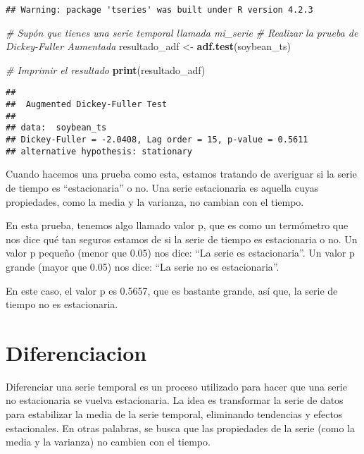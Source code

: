 \documentclass[
]{book}
\newenvironment{Shaded}{\begin{snugshade}}{\end{snugshade}}
\newcommand{\CommentTok}[1]{\textcolor[rgb]{0.56,0.35,0.01}{\textit{#1}}}
\newcommand{\FunctionTok}[1]{\textcolor[rgb]{0.13,0.29,0.53}{\textbf{#1}}}
\newcommand{\NormalTok}[1]{#1}
\newcommand{\OtherTok}[1]{\textcolor[rgb]{0.56,0.35,0.01}{#1}}
\begin{document}
\begin{verbatim}
## Warning: package 'tseries' was built under R version 4.2.3
\end{verbatim}

\begin{Shaded}
\begin{Highlighting}[]
\CommentTok{\# Supón que tienes una serie temporal llamada \textquotesingle{}mi\_serie\textquotesingle{}}
\CommentTok{\# Realizar la prueba de Dickey{-}Fuller Aumentada}
\NormalTok{resultado\_adf }\OtherTok{\textless{}{-}} \FunctionTok{adf.test}\NormalTok{(soybean\_ts)}

\CommentTok{\# Imprimir el resultado}
\FunctionTok{print}\NormalTok{(resultado\_adf)}
\end{Highlighting}
\end{Shaded}

\begin{verbatim}
## 
##  Augmented Dickey-Fuller Test
## 
## data:  soybean_ts
## Dickey-Fuller = -2.0408, Lag order = 15, p-value = 0.5611
## alternative hypothesis: stationary
\end{verbatim}

Cuando hacemos una prueba como esta, estamos tratando de averiguar si la serie de tiempo es ``estacionaria'' o no. Una serie estacionaria es aquella cuyas propiedades, como la media y la varianza, no cambian con el tiempo.

En esta prueba, tenemos algo llamado valor p, que es como un termómetro que nos dice qué tan seguros estamos de si la serie de tiempo es estacionaria o no. Un valor p pequeño (menor que 0.05) nos dice: ``La serie es estacionaria''. Un valor p grande (mayor que 0.05) nos dice: ``La serie no es estacionaria''.

En este caso, el valor p es 0.5657, que es bastante grande, así que, la serie de tiempo no es estacionaria.

\hypertarget{diferenciacion}{%
\chapter{Diferenciacion}\label{diferenciacion}}

Diferenciar una serie temporal es un proceso utilizado para hacer que una serie no estacionaria se vuelva estacionaria. La idea es transformar la serie de datos para estabilizar la media de la serie temporal, eliminando tendencias y efectos estacionales. En otras palabras, se busca que las propiedades de la serie (como la media y la varianza) no cambien con el tiempo.
\end{document}
